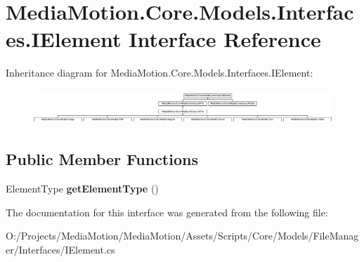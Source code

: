 \hypertarget{interface_media_motion_1_1_core_1_1_models_1_1_interfaces_1_1_i_element}{\section{Media\+Motion.\+Core.\+Models.\+Interfaces.\+I\+Element Interface Reference}
\label{interface_media_motion_1_1_core_1_1_models_1_1_interfaces_1_1_i_element}
}
Inheritance diagram for Media\+Motion.\+Core.\+Models.\+Interfaces.\+I\+Element\+:\begin{figure}[H]
\begin{center}
\leavevmode
\includegraphics[height=1.328588cm]{interface_media_motion_1_1_core_1_1_models_1_1_interfaces_1_1_i_element}
\end{center}
\end{figure}
\subsection*{Public Member Functions}
\begin{DoxyCompactItemize}
\item 
\hypertarget{interface_media_motion_1_1_core_1_1_models_1_1_interfaces_1_1_i_element_a0cb02a2f042b8c70ab2cd63937f1219f}{Element\+Type {\bfseries get\+Element\+Type} ()}\label{interface_media_motion_1_1_core_1_1_models_1_1_interfaces_1_1_i_element_a0cb02a2f042b8c70ab2cd63937f1219f}

\end{DoxyCompactItemize}


The documentation for this interface was generated from the following file\+:\begin{DoxyCompactItemize}
\item 
O\+:/\+Projects/\+Media\+Motion/\+Media\+Motion/\+Assets/\+Scripts/\+Core/\+Models/\+File\+Manager/\+Interfaces/I\+Element.\+cs\end{DoxyCompactItemize}
